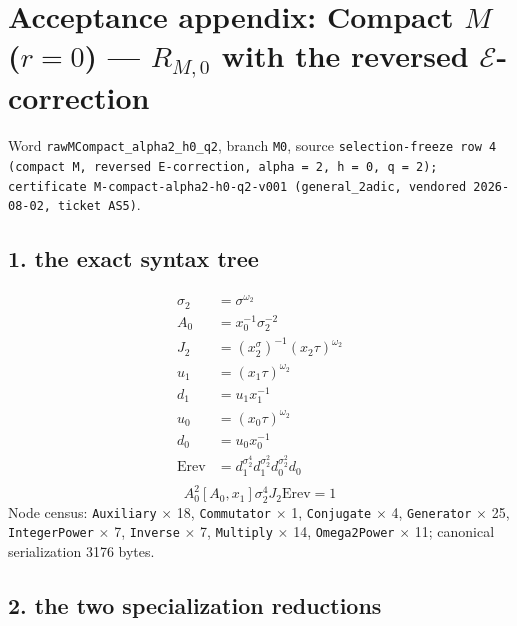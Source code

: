 %

\section{Acceptance appendix: Compact $M$ ($r = 0$) --- $R_{M,0}$ with the reversed $\mathcal{E}$-correction}
\label{sec:appendix-M0}

Word \texttt{rawMCompact\_alpha2\_h0\_q2}, branch \texttt{M0}, source \texttt{selection-freeze row 4 (compact M, reversed E-correction, alpha = 2, h = 0, q = 2); certificate M-compact-alpha2-h0-q2-v001 (general\_2adic, vendored 2026-08-02, ticket AS5)}.

\subsection{1. the exact syntax tree}
\begin{align*}
  \sigma_2 &= \sigma^{\omega_2}\\
  A_0 &= x_0^{-1}\sigma_2^{-2}\\
  J_2 &= (x_2^\sigma)^{-1}(x_2\tau)^{\omega_2}\\
  u_1 &= (x_1\tau)^{\omega_2}\\
  d_1 &= u_1x_1^{-1}\\
  u_0 &= (x_0\tau)^{\omega_2}\\
  d_0 &= u_0x_0^{-1}\\
  \mathrm{Erev} &= d_1^{\sigma_2^4}d_1^{\sigma_2^2}d_0^{\sigma_2^2}d_0\\
\end{align*}
\[ A_0^2[A_0,x_1]\sigma_2^4J_2\mathrm{Erev} = 1 \]
Node census: \texttt{Auxiliary} $\times$ 18, \texttt{Commutator} $\times$ 1, \texttt{Conjugate} $\times$ 4, \texttt{Generator} $\times$ 25, \texttt{IntegerPower} $\times$ 7, \texttt{Inverse} $\times$ 7, \texttt{Multiply} $\times$ 14, \texttt{Omega2Power} $\times$ 11; canonical serialization 3176 bytes.

\subsection{2. the two specialization reductions}


